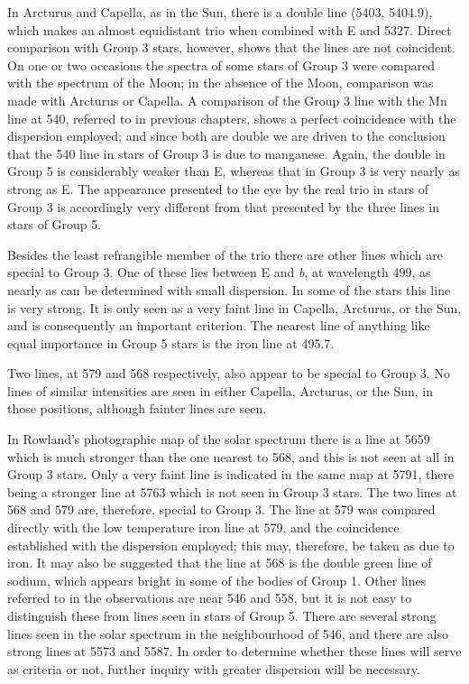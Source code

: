 \documentclass[a4paper, 12pt, oneside, polutonikogreek, english]{article}
\begin{document}
In Arcturus and Capella, as in the Sun, there is a double line (5403, 5404.9), which makes an almost equidistant trio when combined with E and 5327. Direct comparison with Group 3 stars, however, shows that the lines are not coincident. On one or two occasions the spectra of some stars of Group 3 were compared with the spectrum of the Moon; in the absence of the Moon, comparison was made with Arcturus or Capella. A comparison of the Group 3 line with the Mn line at 540, referred to in previous chapters, shows a perfect coincidence with the dispersion employed; and since both are double we are driven to the conclusion that the 540 line in stars of Group 3 is due to manganese. Again, the double in Group 5 is considerably weaker than E, whereas that in Group 3 is very nearly as strong as E. The appearance presented to the eye by the real trio in stars of Group 3 is accordingly very different from that presented by the three lines in stars of Group 5.

Besides the least refrangible member of the trio there are other lines which are special to Group 3. One of these lies between E and \emph{b}, at wavelength 499, as nearly as can be determined with small dispersion. In some of the stars this line is very strong. It is only seen as a very faint line in Capella, Arcturus, or the Sun, and is consequently an important criterion. The nearest line of anything like equal importance in Group 5 stars is the iron line at 495.7.

Two lines, at 579 and 568 respectively, also appear to be special to Group 3. No lines of similar intensities are seen in either Capella, Arcturus, or the Sun, in those positions, although fainter lines are seen.

In Rowland's photographic map of the solar spectrum there is a line at 5659 which is much stronger than the one nearest to 568, and this is not seen at all in Group 3 stars. Only a very faint line is indicated in the same map at 5791, there being a stronger line at 5763 which is not seen in Group 3 stars. The two lines at 568 and 579 are, therefore, special to Group 3. The line at 579 was compared directly with the low temperature iron line at 579, and the coincidence established with the dispersion employed; this may, therefore, be taken as due to iron. It may also be suggested that the line at 568 is the double green line of sodium, which appears bright in some of the bodies of Group 1. Other lines referred to in the observations are near 546 and 558, but it is not easy to distinguish these from lines seen in stars of Group 5. There are several strong lines seen in the solar spectrum in the neighbourhood of 546, and there are also strong lines at 5573 and 5587. In order to determine whether these lines will serve as criteria or not, further inquiry with greater dispersion will be necessary.
\end{document}
